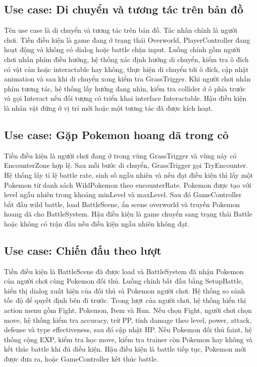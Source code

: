 \subsection{Use case: Di chuyển và tương tác trên bản đồ}

Tên use case là di chuyển và tương tác trên bản đồ. Tác nhân chính là người chơi. Tiền điều kiện là game đang ở trạng thái Overworld, PlayerController đang hoạt động và không có dialog hoặc battle chặn input. Luồng chính gồm người chơi nhấn phím điều hướng, hệ thống xác định hướng di chuyển, kiểm tra ô đích có vật cản hoặc interactable hay không, thực hiện di chuyển tới ô đích, cập nhật animation và sau khi di chuyển xong kiểm tra GrassTrigger. Khi người chơi nhấn phím tương tác, hệ thống lấy hướng đang nhìn, kiểm tra collider ở ô phía trước và gọi Interact nếu đối tượng có triển khai interface Interactable. Hậu điều kiện là nhân vật đứng ở vị trí mới hoặc một tương tác đã được kích hoạt.

\subsection{Use case: Gặp Pokemon hoang dã trong cỏ}

Tiền điều kiện là người chơi đang ở trong vùng GrassTrigger và vùng này có EncounterZone hợp lệ. Sau mỗi bước di chuyển, GrassTrigger gọi TryEncounter. Hệ thống lấy tỉ lệ battle rate, sinh số ngẫu nhiên và nếu đạt điều kiện thì lấy một Pokemon từ danh sách WildPokemon theo encounterRate. Pokemon được tạo với level ngẫu nhiên trong khoảng minLevel và maxLevel. Sau đó GameController bắt đầu wild battle, load BattleScene, ẩn scene overworld và truyền Pokemon hoang dã cho BattleSystem. Hậu điều kiện là game chuyển sang trạng thái Battle hoặc không có trận đấu nếu điều kiện ngẫu nhiên không đạt.

\subsection{Use case: Chiến đấu theo lượt}

Tiền điều kiện là BattleScene đã được load và BattleSystem đã nhận Pokemon của người chơi cùng Pokemon đối thủ. Luồng chính bắt đầu bằng SetupBattle, hiển thị dialog xuất hiện của đối thủ và Pokemon người chơi. Hệ thống so sánh tốc độ để quyết định bên đi trước. Trong lượt của người chơi, hệ thống hiển thị action menu gồm Fight, Pokemon, Item và Run. Nếu chọn Fight, người chơi chọn move, hệ thống kiểm tra accuracy, trừ PP, tính damage theo level, power, attack, defense và type effectiveness, sau đó cập nhật HP. Nếu Pokemon đối thủ faint, hệ thống cộng EXP, kiểm tra học move, kiểm tra trainer còn Pokemon hay không và kết thúc battle khi đủ điều kiện. Hậu điều kiện là battle tiếp tục, Pokemon mới được đưa ra, hoặc GameController kết thúc battle.

